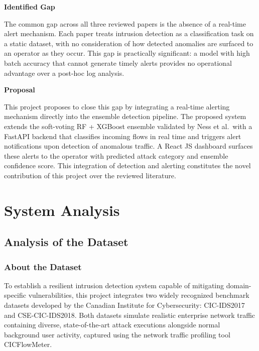 \documentclass[12pt,a4paper]{report}
\begin{document}
\textbf{Identified Gap}

The common gap across all three reviewed papers is the absence of a real-time alert mechanism. Each paper treats intrusion detection as a classification task on a static dataset, with no consideration of how detected anomalies are surfaced to an operator as they occur. This gap is practically significant: a model with high batch accuracy that cannot generate timely alerts provides no operational advantage over a post-hoc log analysis.

\textbf{Proposal}

This project proposes to close this gap by integrating a real-time alerting mechanism directly into the ensemble detection pipeline. The proposed system extends the soft-voting RF + XGBoost ensemble validated by Ness et al.\ with a FastAPI backend that classifies incoming flows in real time and triggers alert notifications upon detection of anomalous traffic. A React JS dashboard surfaces these alerts to the operator with predicted attack category and ensemble confidence score. This integration of detection and alerting constitutes the novel contribution of this project over the reviewed literature.


\newpage
\chapter{System Analysis}

\section{Analysis of the Dataset}

\subsection{About the Dataset}

To establish a resilient intrusion detection system capable of mitigating domain-specific vulnerabilities, this project integrates two widely recognized benchmark datasets developed by the Canadian Institute for Cybersecurity: CIC-IDS2017 and CSE-CIC-IDS2018. Both datasets simulate realistic enterprise network traffic containing diverse, state-of-the-art attack executions alongside normal background user activity, captured using the network traffic profiling tool CICFlowMeter.
\end{document}
